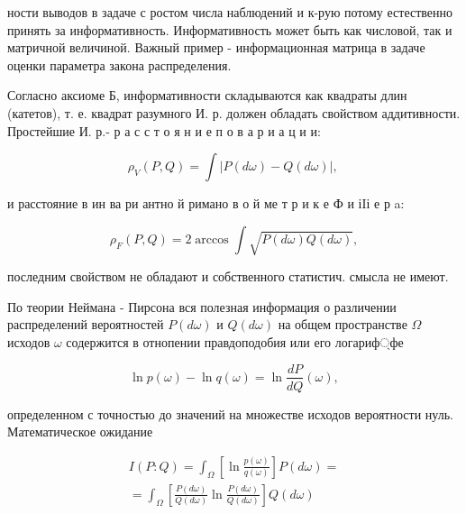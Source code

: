 \documentclass[10pt]{article}
\begin{document}
ности выводов в задаче с ростом числа наблюдений и к-рую потому естественно принять за информативность. Информативность может быть как числовой, так и матричной величиной. Важный пример - информационная матрица в задаче оценки параметра закона распределения.



Согласно аксиоме Б, информативности складываются как квадраты длин (катетов), т. е. квадрат разумного И. р. должен обладать свойством аддитивности. Простейшие И. р.- р а с с т о я н и е п о в а р и а ц и и:



\[

\rho_{V}(P, Q)=\int|P(d \omega)-Q(d \omega)| \text {, }

\]



и расстояние в ин ва ри антно й римано в о й ме т р и к е Ф и іIі е р a:



\[

\rho_{F}(P, Q)=2 \arccos \int \sqrt{P(d \omega) Q(d \omega)},

\]



последним свойством не обладают и собственного статистич. смысла не имеют.



По теории Неймана - Пирсона вся полезная информация о различении распределений вероятностей $P(d \omega)$ и $Q(d \omega)$ на общем пространстве $\Omega$ исходов $\omega$ содержится в отнопении правдоподобия или его логариф্фе



\[

\ln p(\omega)-\ln q(\omega)=\ln \frac{d P}{d Q}(\omega),

\]



определенном с точностью до значений на множестве исходов вероятности нуль. Математическое ожидание



\[

\begin{gathered}

I(P: Q)=\int_{\Omega}\left[\ln \frac{p(\omega)}{q(\omega)}\right] P(d \omega)= \\

=\int_{\Omega}\left[\frac{P(d \omega)}{Q(d \omega)} \ln \frac{P(d \omega)}{Q(d \omega)}\right] Q(d \omega)

\end{gathered}

\]
\end{document}
